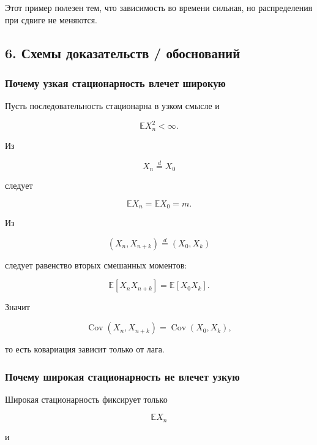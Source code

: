 \documentclass[
  11pt,
  a4paper,
]{article}
\begin{document}
Этот пример полезен тем, что зависимость во времени сильная, но
распределения при сдвиге не меняются.

\subsection{6. Схемы доказательств /
обоснований}\label{ux441ux445ux435ux43cux44b-ux434ux43eux43aux430ux437ux430ux442ux435ux43bux44cux441ux442ux432-ux43eux431ux43eux441ux43dux43eux432ux430ux43dux438ux439}

\subsubsection{Почему узкая стационарность влечет
широкую}\label{ux43fux43eux447ux435ux43cux443-ux443ux437ux43aux430ux44f-ux441ux442ux430ux446ux438ux43eux43dux430ux440ux43dux43eux441ux442ux44c-ux432ux43bux435ux447ux435ux442-ux448ux438ux440ux43eux43aux443ux44e}

Пусть последовательность стационарна в узком смысле и

\[
\mathbb E X_n^2<\infty.
\]

Из

\[
X_n\stackrel d=X_0
\]

следует

\[
\mathbb E X_n=\mathbb E X_0=m.
\]

Из

\[
(X_n,X_{n+k})\stackrel d=(X_0,X_k)
\]

следует равенство вторых смешанных моментов:

\[
\mathbb E[X_nX_{n+k}]=\mathbb E[X_0X_k].
\]

Значит

\[
\operatorname{Cov}(X_n,X_{n+k})
=
\operatorname{Cov}(X_0,X_k),
\]

то есть ковариация зависит только от лага.

\subsubsection{Почему широкая стационарность не влечет
узкую}\label{ux43fux43eux447ux435ux43cux443-ux448ux438ux440ux43eux43aux430ux44f-ux441ux442ux430ux446ux438ux43eux43dux430ux440ux43dux43eux441ux442ux44c-ux43dux435-ux432ux43bux435ux447ux435ux442-ux443ux437ux43aux443ux44e}

Широкая стационарность фиксирует только

\[
\mathbb E X_n
\]

и
\end{document}
